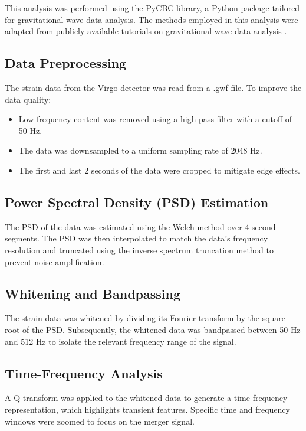 \documentclass{article}
\begin{document}
This analysis was performed using the PyCBC library, a Python package tailored for gravitational wave data analysis. The methods employed in this analysis were adapted from publicly available tutorials on gravitational wave data analysis \cite{pycbc_tutorial, odw2020_tutorial}.

\subsection{Data Preprocessing}
The strain data from the Virgo detector was read from a .gwf file. To improve the data quality:
\begin{itemize}
    \item Low-frequency content was removed using a high-pass filter with a cutoff of 50 Hz.
    \item The data was downsampled to a uniform sampling rate of 2048 Hz.
    \item The first and last 2 seconds of the data were cropped to mitigate edge effects.
\end{itemize}

\subsection{Power Spectral Density (PSD) Estimation}
The PSD of the data was estimated using the Welch method over 4-second segments. The PSD was then interpolated to match the data's frequency resolution and truncated using the inverse spectrum truncation method to prevent noise amplification.

\subsection{Whitening and Bandpassing}
The strain data was whitened by dividing its Fourier transform by the square root of the PSD. Subsequently, the whitened data was bandpassed between 50 Hz and 512 Hz to isolate the relevant frequency range of the signal.

\subsection{Time-Frequency Analysis}
A Q-transform was applied to the whitened data to generate a time-frequency representation, which highlights transient features. Specific time and frequency windows were zoomed to focus on the merger signal.
\end{document}
